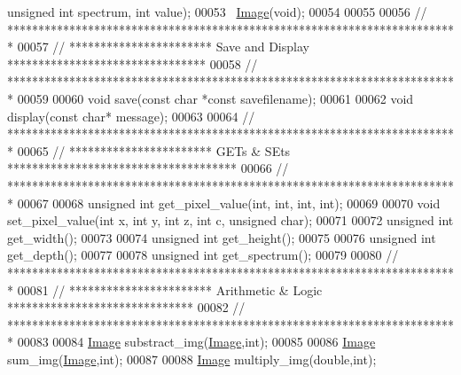 \begin{DoxyCode}
{      unsigned} \textcolor{keywordtype}{int} spectrum, \textcolor{keywordtype}{int} value);
00053     ~\hyperlink{class_image}{Image}(\textcolor{keywordtype}{void}); 
00054     
00055 
00056 \textcolor{comment}{// *************************************************************************}
00057 \textcolor{comment}{// *********************** Save and Display ********************************}
00058 \textcolor{comment}{// *************************************************************************}
00059 
00060     \textcolor{keywordtype}{void} save(\textcolor{keyword}{const} \textcolor{keywordtype}{char} *\textcolor{keyword}{const} savefilename); 
00061 
00062     \textcolor{keywordtype}{void} display(\textcolor{keyword}{const} \textcolor{keywordtype}{char}* message); 
00063     
00064 \textcolor{comment}{// *************************************************************************}
00065 \textcolor{comment}{// *********************** GETs & SEts *************************************}
00066 \textcolor{comment}{// *************************************************************************}
00067 
00068     \textcolor{keywordtype}{unsigned} \textcolor{keywordtype}{int} get\_pixel\_value(\textcolor{keywordtype}{int}, \textcolor{keywordtype}{int}, \textcolor{keywordtype}{int}, \textcolor{keywordtype}{int}); 
00069 
00070     \textcolor{keywordtype}{void} set\_pixel\_value(\textcolor{keywordtype}{int} x, \textcolor{keywordtype}{int} y, \textcolor{keywordtype}{int} z, \textcolor{keywordtype}{int} c, \textcolor{keywordtype}{unsigned} \textcolor{keywordtype}{char}); 
00071     
00072     \textcolor{keywordtype}{unsigned} \textcolor{keywordtype}{int} get\_width();
00073     
00074     \textcolor{keywordtype}{unsigned} \textcolor{keywordtype}{int} get\_height();
00075     
00076     \textcolor{keywordtype}{unsigned} \textcolor{keywordtype}{int} get\_depth();
00077     
00078     \textcolor{keywordtype}{unsigned} \textcolor{keywordtype}{int} get\_spectrum();
00079 
00080 \textcolor{comment}{// *************************************************************************}
00081 \textcolor{comment}{// *********************** Arithmetic & Logic ******************************}
00082 \textcolor{comment}{// *************************************************************************}
00083 
00084     \hyperlink{class_image}{Image} substract\_img(\hyperlink{class_image}{Image},\textcolor{keywordtype}{int}); 
00085 
00086     \hyperlink{class_image}{Image} sum\_img(\hyperlink{class_image}{Image},\textcolor{keywordtype}{int}); 
00087     
00088     \hyperlink{class_image}{Image} multiply\_img(\textcolor{keywordtype}{double},\textcolor{keywordtype}{int}); 

\end{DoxyCode}
